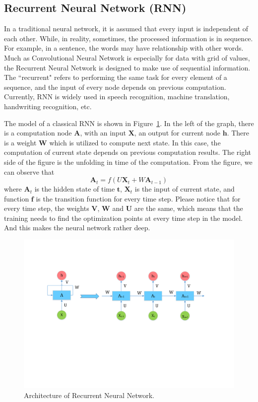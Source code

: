 \subsection{Recurrent Neural Network (RNN)}

In a traditional neural network, it is assumed that every input is independent of each other. While, in reality, sometimes, the processed information is in sequence. For example, in a sentence, the words may have relationship with other words. Much as Convolutional Neural Network is especially for data with grid of values, the Recurrent Neural Network is designed to make use of sequential information. The ``recurrent" refers to performing the same task for every element of a sequence, and the input of every node depends on previous computation. Currently, RNN is widely used in speech recognition, machine translation, handwriting recognition, etc.

The model of a classical RNN is shown in Figure~\ref{fig:rnn}. In the left of the graph, there is a computation node $\textbf{A}$, with an input $\textbf{X}$, an output for current node $\textbf{h}$. There is a weight $\textbf{W}$ which is utilized to compute next state. In this case, the computation of current state depends on previous computation results. The right side of the figure is the unfolding in time of the computation. From the figure, we can observe that
$$\textbf{A}_t = f(U\textbf{X}_t + W\textbf{A}_{t-1})$$
where $\textbf{A}_t$ is the hidden state of time $\textbf{t}$, $\textbf{X}_t$ is the input of current state, and function $\textbf{f}$ is the transition function for every time step. Please notice that for every time step, the weights $\textbf{V}$, $\textbf{W}$ and $\textbf{U}$ are the same, which means that the training needs to find the optimization points at every time step in the model. And this makes the neural network rather deep.

\begin{figure}[b]
\centering
\includegraphics[scale=0.6]{figure/rnn.pdf}
\caption{Architecture of Recurrent Neural Network.}
\label{fig:rnn}
\end{figure}
